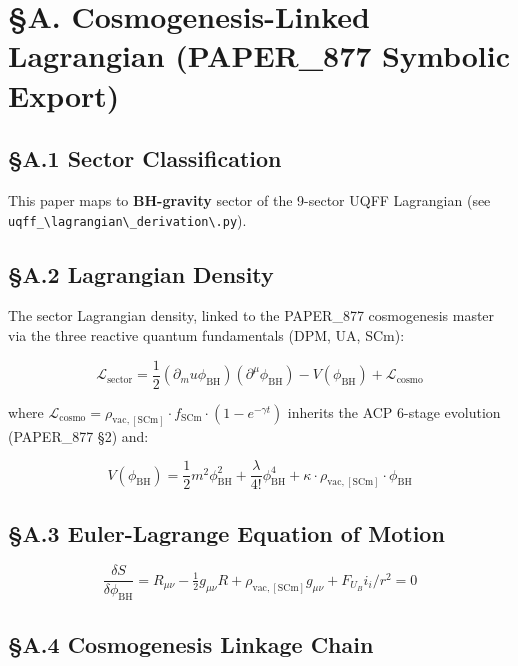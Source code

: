 \documentclass[12pt,a4paper]{article}
\begin{document}
\section{\S{}A. Cosmogenesis-Linked Lagrangian (PAPER\_877 Symbolic Export)}

\subsection{\S{}A.1 Sector Classification}

This paper maps to \textbf{BH-gravity} sector of the 9-sector UQFF Lagrangian (see \texttt{uqff\_\textbackslash {lagrangian\textbackslash \_derivation\textbackslash }.py}).

\subsection{\S{}A.2 Lagrangian Density}

The sector Lagrangian density, linked to the PAPER\_877 cosmogenesis master via the three reactive quantum fundamentals (DPM, UA, SCm):

\begin{equation}
\mathcal{L}_{\mathrm{sector}} = \frac{1}{2}(\partial_mu \phi_{\mathrm{BH}})(\partial^\mu \phi_{\mathrm{BH}}) - V(\phi_{\mathrm{BH}}) + \mathcal{L}_{\mathrm{cosmo}}
\end{equation}

where $\mathcal{L}_{\mathrm{cosmo}} = \rho_{\mathrm{vac,[SCm]}} \cdot f_{\mathrm{SCm}} \cdot (1 - e^{-\gamma t})$ inherits the ACP 6-stage evolution (PAPER\_877 \S{}2) and:

\begin{equation}
V(\phi_{\mathrm{BH}}) = \frac{1}{2} m^2 \phi_{\mathrm{BH}}^2 + \frac{\lambda}{4!} \phi_{\mathrm{BH}}^4 + \kappa \cdot \rho_{\mathrm{vac,[SCm]}} \cdot \phi_{\mathrm{BH}}
\end{equation}

\subsection{\S{}A.3 Euler-Lagrange Equation of Motion}

\begin{equation}
\boxed{\frac{\delta S}{\delta \phi_{\mathrm{BH}}} = R_{\mu\nu} - \tfrac{1}{2}g_{\mu\nu}R + \rho_{\mathrm{vac,[SCm]}} g_{\mu\nu} + F_U_Bi_i/r^2 = 0}
\end{equation}

\subsection{\S{}A.4 Cosmogenesis Linkage Chain}
\end{document}
